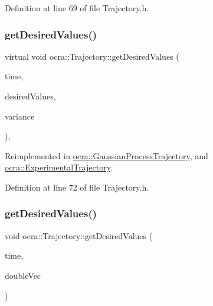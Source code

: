 Definition at line 69 of file Trajectory.\+h.

\hypertarget{classocra_1_1Trajectory_aab6869cf5bc4a7c44eac36a0e49255b9}{}\label{classocra_1_1Trajectory_aab6869cf5bc4a7c44eac36a0e49255b9} 
\subsubsection{\texorpdfstring{get\+Desired\+Values()}{getDesiredValues()}\hspace{0.1cm}{\footnotesize\ttfamily [2/6]}}
{\footnotesize\ttfamily virtual void ocra\+::\+Trajectory\+::get\+Desired\+Values (\begin{DoxyParamCaption}\item[{double}]{time,  }\item[{Eigen\+::\+Matrix\+Xd \&}]{desired\+Values,  }\item[{Eigen\+::\+Vector\+Xd \&}]{variance }\end{DoxyParamCaption})\hspace{0.3cm}{\ttfamily [inline]}, {\ttfamily [virtual]}}



Reimplemented in \hyperlink{classocra_1_1GaussianProcessTrajectory_a5ae11f8f2525d4b92236b1df20b1a9d7}{ocra\+::\+Gaussian\+Process\+Trajectory}, and \hyperlink{classocra_1_1ExperimentalTrajectory_a8d0b41849d2e99a13dd2ef1ae0b0eb46}{ocra\+::\+Experimental\+Trajectory}.



Definition at line 72 of file Trajectory.\+h.

\hypertarget{classocra_1_1Trajectory_a195921776ed3d3b403dcb8728ee8d02a}{}\label{classocra_1_1Trajectory_a195921776ed3d3b403dcb8728ee8d02a} 
\subsubsection{\texorpdfstring{get\+Desired\+Values()}{getDesiredValues()}\hspace{0.1cm}{\footnotesize\ttfamily [3/6]}}
{\footnotesize\ttfamily void ocra\+::\+Trajectory\+::get\+Desired\+Values (\begin{DoxyParamCaption}\item[{double}]{time,  }\item[{std\+::vector$<$ double $>$ \&}]{double\+Vec }\end{DoxyParamCaption})}



